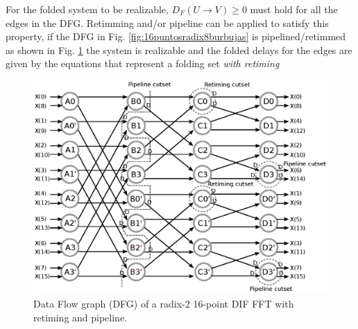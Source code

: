 \documentclass[journal,comsoc]{IEEEtran}
\begin{document}
For the folded system to be realizable, $D_F(U\to V)\geq0$ must hold for all the edges in the DFG. Retimming and/or pipeline can be applied to satisfy this property, if the DFG in Fig. \ref{fig:16puntosradix8burbujas} is pipelined/retimmed as shown in Fig. \ref{fig:dfg_16_ret} the system is realizable and the folded delays for the edges are given by the equations that represent a folding set \textit{with retiming}
\begin{figure}[h!]
\centering
\includegraphics[width=\linewidth]{Diagramas/Butter16_pipe.eps}
\caption{Data Flow graph (DFG) of a radix-2 16-point DIF FFT with retiming and pipeline.}
\label{fig:dfg_16_ret}
\end{figure}
\end{document}
